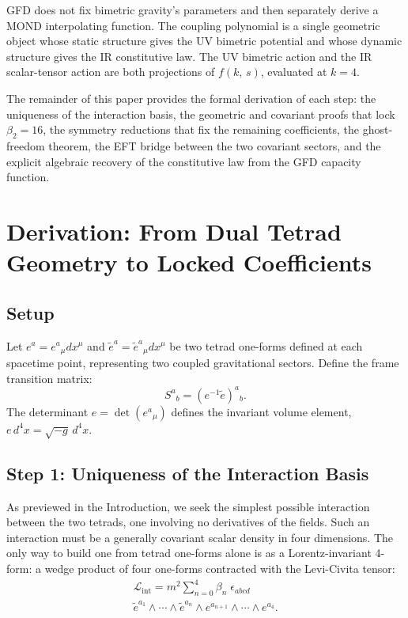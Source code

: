 \documentclass[twocolumn]{iopjournal}
\begin{document}
GFD does not fix bimetric gravity's parameters and then separately derive a MOND interpolating function. The coupling polynomial is a single geometric object whose static structure gives the UV bimetric potential and whose dynamic structure gives the IR constitutive law. The UV bimetric action and the IR scalar-tensor action are both projections of $f(k,\, s)$, evaluated at $k = 4$.

The remainder of this paper provides the formal derivation of each step: the uniqueness of the interaction basis, the geometric and covariant proofs that lock $\beta_2 = 16$, the symmetry reductions that fix the remaining coefficients, the ghost-freedom theorem, the EFT bridge between the two covariant sectors, and the explicit algebraic recovery of the constitutive law from the GFD capacity function.


\section*{Derivation: From Dual Tetrad Geometry to Locked Coefficients}

\subsection*{Setup}
Let $e^a = e^a{}_\mu dx^\mu$ and $\tilde{e}^a = \tilde{e}^a{}_\mu dx^\mu$ be two tetrad one-forms defined at each spacetime point, representing two coupled gravitational sectors. Define the frame transition matrix:
\begin{equation}
S^a{}_b = (e^{-1}\tilde{e})^a{}_b .
\end{equation}
The determinant $e = \det(e^a{}_\mu)$ defines the invariant volume element, $e\, d^4x = \sqrt{-g}\, d^4x$.

\subsection*{Step 1: Uniqueness of the Interaction Basis}
As previewed in the Introduction, we seek the simplest possible interaction between the two tetrads, one involving no derivatives of the fields. Such an interaction must be a generally covariant scalar density in four dimensions. The only way to build one from tetrad one-forms alone is as a Lorentz-invariant 4-form: a wedge product of four one-forms contracted with the Levi-Civita tensor:
\begin{multline}
\mathcal{L}_{\text{int}} = m^2 \sum_{n=0}^{4} \beta_n\; \epsilon_{abcd}\; \\
\tilde{e}^{a_1}\!\wedge \cdots \wedge \tilde{e}^{a_n} \wedge e^{a_{n+1}}\!\wedge \cdots \wedge e^{a_4}.
\end{multline}
\end{document}
